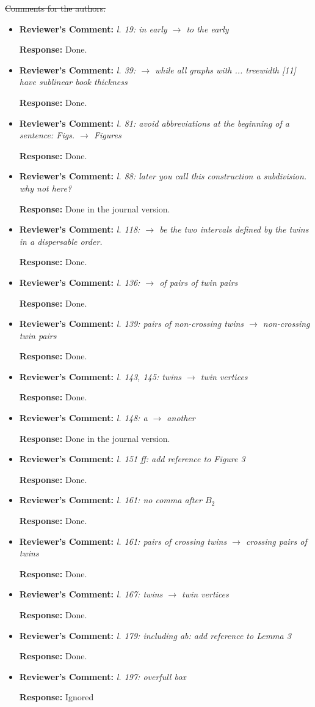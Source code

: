 \documentclass{article}
\newcommand{\rcomment}[1]{\vspace{0.3cm} \item \textbf{Reviewer's Comment:} {\em #1}}
\newcommand{\response}{\vspace{0.2cm} \textbf{Response: }}
\begin{document}
\begin{itemize}
{\st{Comments for the authors:}

\begin{itemize}
\rcomment{l. 19: in early $\rightarrow$ to the early}

\response{Done.}

\rcomment{l. 39: $\rightarrow$ while all graphs with ... treewidth [11] have sublinear book thickness}

\response{Done.}

\rcomment{l. 81: avoid abbreviations at the beginning of a sentence: Figs. $\rightarrow$ Figures}

\response{Done.}

\rcomment{l. 88: later you call this construction a subdivision. why not here?}

\response{Done in the journal version.}

\rcomment{l. 118: $\rightarrow$ be the two intervals defined by the twins in a dispersable order.}

\response{Done.}

\rcomment{l. 136: $\rightarrow$ of pairs of twin pairs}

\response{Done.}

\rcomment{l. 139: pairs of non-crossing twins $\rightarrow$ non-crossing twin pairs}

\response{Done.}

\rcomment{l. 143, 145: twins $\rightarrow$ twin vertices}

\response{Done.}

\rcomment{l. 148: a $\rightarrow$ another}

\response{Done in the journal version.}

\rcomment{l. 151 ff: add reference to Figure 3}

\response{Done.}

\rcomment{l. 161: no comma after $B_2$}

\response{Done.}

\rcomment{l. 161: pairs of crossing twins $\rightarrow$ crossing pairs of twins}

\response{Done.}

\rcomment{l. 167: twins $\rightarrow$ twin vertices}

\response{Done.}

\rcomment{l. 179: including ab: add reference to Lemma 3}

\response{Done.}

\rcomment{l. 197: overfull box}

\response{Ignored}


\end{itemize}}
\end{itemize}
\end{document}

